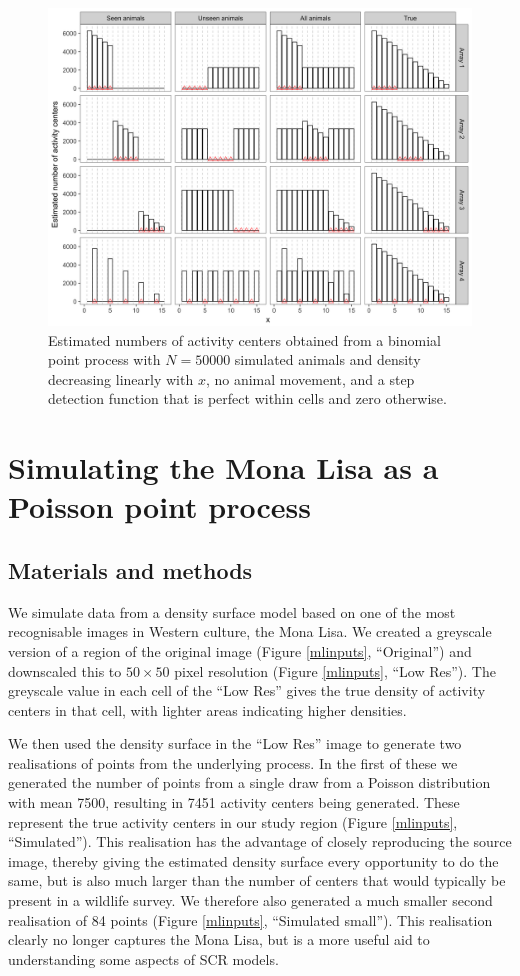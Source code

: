 \documentclass[a4paper,12pt]{article}
\begin{document}
\begin{figure}[htbp]
\centering
\includegraphics[width=1\textwidth]{binompp_inf.png}
\caption{Estimated numbers of activity centers obtained from a binomial point process with $N=50000$ simulated animals and density decreasing linearly with $x$, no animal movement, and a step detection function that is perfect within cells and zero otherwise.}
\label{binom}
\end{figure}

\section{Simulating the Mona Lisa as a Poisson point process} \label{monalisa}

\subsection{Materials and methods}
We simulate data from a density surface model based on one of the most recognisable images in Western culture, the Mona Lisa. We created a greyscale version of a region of the original image (Figure \ref{mlinputs}, ``Original'') and downscaled this to $50\times 50$ pixel resolution (Figure \ref{mlinputs}, ``Low Res''). The greyscale value in each cell of the ``Low Res'' gives the true density of activity centers in that cell, with lighter areas indicating higher densities. 

We then used the density surface in the ``Low Res'' image to generate two realisations of points from the underlying process. In the first of these we generated the number of points from a single draw from a Poisson distribution with mean 7500, resulting in 7451 activity centers being generated. These represent the true activity centers in our study region (Figure \ref{mlinputs}, ``Simulated''). This realisation has the advantage of closely reproducing the source image, thereby giving the estimated density surface every opportunity to do the same, but is also much larger than the number of centers that would typically be present in a wildlife survey. We therefore also generated a much smaller second realisation of 84 points (Figure \ref{mlinputs}, ``Simulated small''). This realisation clearly no longer captures the Mona Lisa, but is a more useful aid to understanding some aspects of SCR models.
\end{document}
